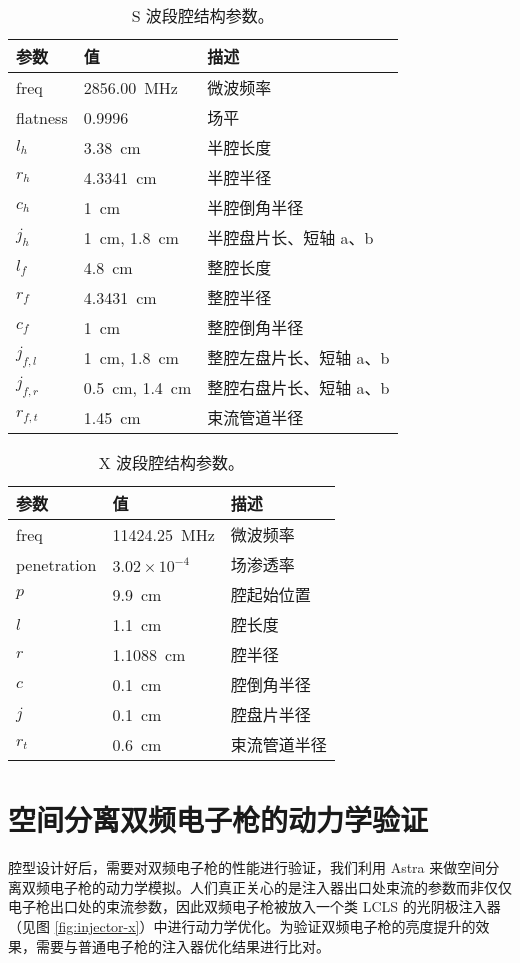 \begin{table}[htbp]
\centering
\caption{\label{tab:geo_s}
S 波段腔结构参数。}
\begin{tabular}{lll}
\toprule
参数 & 值 & 描述\\
\midrule
freq & \SI{2856.00}{MHz} & 微波频率  \\
flatness & 0.9996 & 场平  \\
\midrule
$l_h$ & \SI{3.38}{cm} & 半腔长度  \\
$r_h$ & \SI{4.3341}{cm} & 半腔半径  \\
$c_h$ & \SI{1}{cm} & 半腔倒角半径  \\
$j_h$ & \SI{1}{cm}, \SI{1.8}{cm} & 半腔盘片长、短轴 a、b \\
$l_f$ & \SI{4.8}{cm} & 整腔长度  \\
$r_f$ & \SI{4.3431}{cm} & 整腔半径  \\
$c_f$ & \SI{1}{cm} & 整腔倒角半径  \\
$j_{f, l}$ & \SI{1}{cm}, \SI{1.8}{cm} & 整腔左盘片长、短轴 a、b \\
$j_{f, r}$ & \SI{0.5}{cm}, \SI{1.4}{cm} & 整腔右盘片长、短轴 a、b \\
$r_{f, t}$ & \SI{1.45}{cm} & 束流管道半径  \\
\bottomrule
\end{tabular}
\end{table}

\begin{table}[htbp]
\centering
\caption{\label{tab:geo_x}
X 波段腔结构参数。}
\begin{tabular}{lll}
\toprule
参数 & 值 & 描述\\
\midrule
freq & \SI{11424.25}{MHz} & 微波频率  \\
penetration & $3.02\times10^{-4}$ & 场渗透率  \\
\midrule
$p$ & \SI{9.9}{cm} & 腔起始位置  \\
$l$ & \SI{1.1}{cm} & 腔长度  \\
$r$ & \SI{1.1088}{cm} & 腔半径  \\
$c$ & \SI{0.1}{cm} & 腔倒角半径  \\
$j$ & \SI{0.1}{cm} & 腔盘片半径  \\
$r_t$ & \SI{0.6}{cm} & 束流管道半径  \\
\bottomrule
\end{tabular}
\end{table}

\section{空间分离双频电子枪的动力学验证}
腔型设计好后，需要对双频电子枪的性能进行验证，我们利用 Astra 来做空间分离双频电子枪的动力学模拟。人们真正关心的是注入器出口处束流的参数而非仅仅电子枪出口处的束流参数，因此双频电子枪被放入一个类 LCLS 的光阴极注入器（见图 \ref{fig:injector-x}）中进行动力学优化。为验证双频电子枪的亮度提升的效果，需要与普通电子枪的注入器优化结果进行比对。

